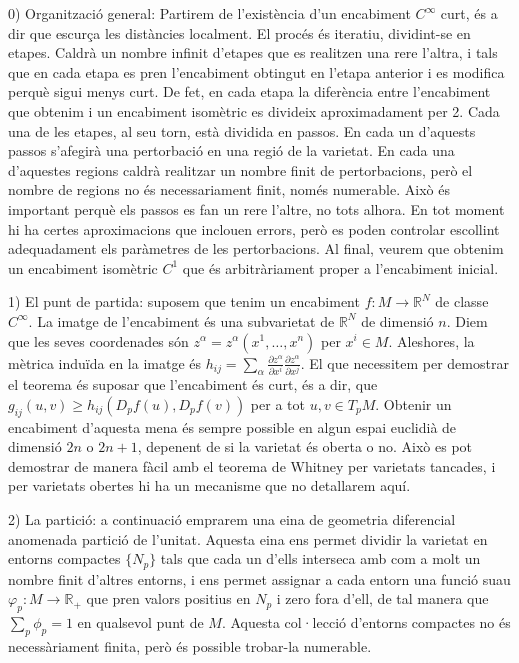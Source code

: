 0) Organització general: Partirem de l'existència d'un encabiment $C^\infty$ curt, és a dir que escurça les distàncies localment. 
El procés és iteratiu, dividint-se en etapes. Caldrà un nombre infinit d'etapes que es realitzen una rere l'altra, i tals que en cada etapa es pren l'encabiment obtingut en l'etapa anterior i es modifica perquè sigui menys curt. De fet, en cada etapa la diferència entre l'encabiment que obtenim i un encabiment isomètric es divideix aproximadament per 2.
Cada una de les etapes, al seu torn, està dividida en passos. En cada un d'aquests passos s'afegirà una pertorbació en una regió de la varietat. En cada una d'aquestes regions caldrà realitzar un nombre finit de pertorbacions, però el nombre de regions no és necessariament finit, només numerable. Això és important perquè els passos es fan un rere l'altre, no tots alhora. 
En tot moment hi ha certes aproximacions que inclouen errors, però es poden controlar escollint adequadament els paràmetres de les pertorbacions.
Al final, veurem que obtenim un encabiment isomètric $C^1$ que és arbitràriament proper a l'encabiment inicial.


1) El punt de partida: suposem que tenim un encabiment $f:M\to \mathbb{R}^N$ de classe $C^\infty$. La imatge de l'encabiment és una subvarietat de $\mathbb{R}^N$ de dimensió $n$. Diem que les seves coordenades són $z^\alpha = z^\alpha(x^1, \dots, x^n)$ per $x^i \in M$. Aleshores, la mètrica induïda en la imatge és $h_{ij} = \sum_{\alpha} \frac{\partial z^\alpha}{\partial x^i}\frac{\partial z^\alpha}{\partial x^j}$. 
El que necessitem per demostrar el teorema és suposar que l'encabiment és curt, és a dir, que $g_{ij}(u,v) \ge h_{ij}(D_pf(u),D_pf(v))$ per a tot $u,v \in T_pM$.
Obtenir un encabiment d'aquesta mena és sempre possible en algun espai euclidià de dimensió $2n$ o $2n+1$, depenent de si la varietat és oberta o no. Això es pot demostrar de manera fàcil amb el teorema de Whitney per varietats tancades, i per varietats obertes hi ha un mecanisme que no detallarem aquí.

2) La partició: a continuació emprarem una eina de geometria diferencial anomenada partició de l'unitat. Aquesta eina ens permet dividir la varietat en entorns compactes $\{ N_p \}$ tals que cada un d'ells interseca amb com a molt un nombre finit d'altres entorns, i ens permet assignar a cada entorn una funció suau $\varphi_p: M \to \mathbb{R}_+$ que pren valors positius en $N_p$ i zero fora d'ell, de tal manera que $\sum_p \phi_p = 1$ en qualsevol punt de $M$. Aquesta col·lecció d'entorns compactes no és necessàriament finita, però és possible trobar-la numerable.

